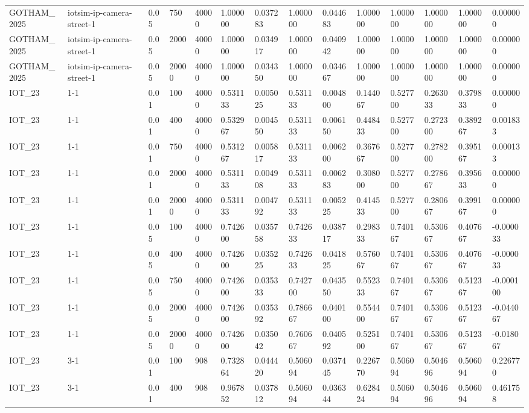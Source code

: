 \begin{tabular}{llllllllllllll}
GOTHAM\_2025 & iotsim-ip-camera-street-1 & 0.05 & 750 & 40000 & 1.000000 & 0.037283 & 1.000000 & 0.044683 & 1.000000 & 1.000000 & 1.000000 & 1.000000 & 0.000000 \\
GOTHAM\_2025 & iotsim-ip-camera-street-1 & 0.05 & 2000 & 40000 & 1.000000 & 0.034917 & 1.000000 & 0.040942 & 1.000000 & 1.000000 & 1.000000 & 1.000000 & 0.000000 \\
GOTHAM\_2025 & iotsim-ip-camera-street-1 & 0.05 & 20000 & 40000 & 1.000000 & 0.034350 & 1.000000 & 0.034667 & 1.000000 & 1.000000 & 1.000000 & 1.000000 & 0.000000 \\
IOT\_23 & 1-1 & 0.01 & 100 & 40000 & 0.531133 & 0.005025 & 0.531133 & 0.004800 & 0.144067 & 0.527700 & 0.263033 & 0.379833 & 0.000000 \\
IOT\_23 & 1-1 & 0.01 & 400 & 40000 & 0.532967 & 0.004550 & 0.531133 & 0.006150 & 0.448433 & 0.527700 & 0.272300 & 0.389267 & 0.001833 \\
IOT\_23 & 1-1 & 0.01 & 750 & 40000 & 0.531267 & 0.005817 & 0.531133 & 0.006200 & 0.367667 & 0.527700 & 0.278200 & 0.395167 & 0.000133 \\
IOT\_23 & 1-1 & 0.01 & 2000 & 40000 & 0.531133 & 0.004908 & 0.531133 & 0.006283 & 0.308000 & 0.527700 & 0.278667 & 0.395633 & 0.000000 \\
IOT\_23 & 1-1 & 0.01 & 20000 & 40000 & 0.531133 & 0.004792 & 0.531133 & 0.005225 & 0.414533 & 0.527700 & 0.280667 & 0.399167 & 0.000000 \\
IOT\_23 & 1-1 & 0.05 & 100 & 40000 & 0.742600 & 0.035758 & 0.742633 & 0.038717 & 0.298333 & 0.740167 & 0.530667 & 0.407667 & -0.000033 \\
IOT\_23 & 1-1 & 0.05 & 400 & 40000 & 0.742600 & 0.035225 & 0.742633 & 0.041825 & 0.576067 & 0.740167 & 0.530667 & 0.407667 & -0.000033 \\
IOT\_23 & 1-1 & 0.05 & 750 & 40000 & 0.742600 & 0.035333 & 0.742700 & 0.043550 & 0.552333 & 0.740167 & 0.530667 & 0.512367 & -0.000100 \\
IOT\_23 & 1-1 & 0.05 & 2000 & 40000 & 0.742600 & 0.035392 & 0.786667 & 0.040100 & 0.554400 & 0.740167 & 0.530667 & 0.512367 & -0.044067 \\
IOT\_23 & 1-1 & 0.05 & 20000 & 40000 & 0.742600 & 0.035042 & 0.760667 & 0.040592 & 0.525100 & 0.740167 & 0.530667 & 0.512367 & -0.018067 \\
IOT\_23 & 3-1 & 0.01 & 100 & 908 & 0.732864 & 0.044420 & 0.506094 & 0.037445 & 0.226770 & 0.506094 & 0.504696 & 0.506094 & 0.226770 \\
IOT\_23 & 3-1 & 0.01 & 400 & 908 & 0.967852 & 0.037812 & 0.506094 & 0.036344 & 0.628424 & 0.506094 & 0.504696 & 0.506094 & 0.461758 \\

\end{tabular}
